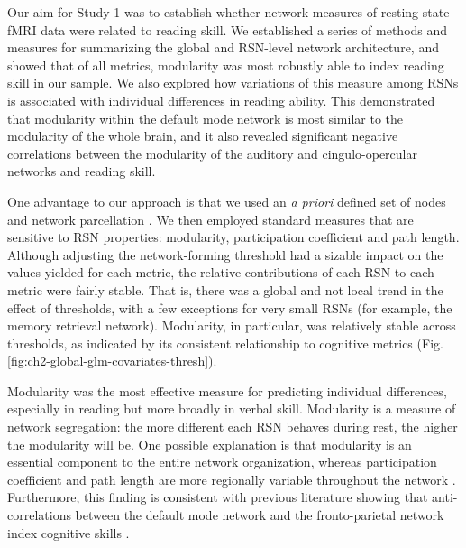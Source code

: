 Our aim for Study 1 was to establish whether network measures of resting-state fMRI data were related to reading skill. We established a series of methods and measures for summarizing the global and RSN-level network architecture, and showed that of all metrics, modularity was most robustly able to index reading skill in our sample. We also explored how variations of this measure among RSNs is associated with individual differences in reading ability. This demonstrated that modularity within the default mode network is most similar to the modularity of the whole brain, and it also revealed significant negative correlations between the modularity of the auditory and cingulo-opercular networks and reading skill.

One advantage to our approach is that we used an \textit{a priori} defined set of nodes and network parcellation \citep{Power2013}. We then employed standard measures that are sensitive to RSN properties: modularity, participation coefficient and path length. Although adjusting the network-forming threshold had a sizable impact on the values yielded for each metric, the relative contributions of each RSN to each metric were fairly stable. That is, there was a global and not local trend in the effect of thresholds, with a few exceptions for very small RSNs (for example, the memory retrieval network). Modularity, in particular, was relatively stable across thresholds, as indicated by its consistent relationship to cognitive metrics (Fig. \ref{fig:ch2-global-glm-covariates-thresh}).

Modularity was the most effective measure for predicting individual differences, especially in reading but more broadly in verbal skill. Modularity is a measure of network segregation: the more different each RSN behaves during rest, the higher the modularity will be. One possible explanation is that modularity is an essential component to the entire network organization, whereas participation coefficient and path length are more regionally variable throughout the network \citep{Bullmore2012}. Furthermore, this finding is consistent with previous literature showing that anti-correlations between the default mode network and the fronto-parietal network index cognitive skills \citep{Anticevic2012}. 

